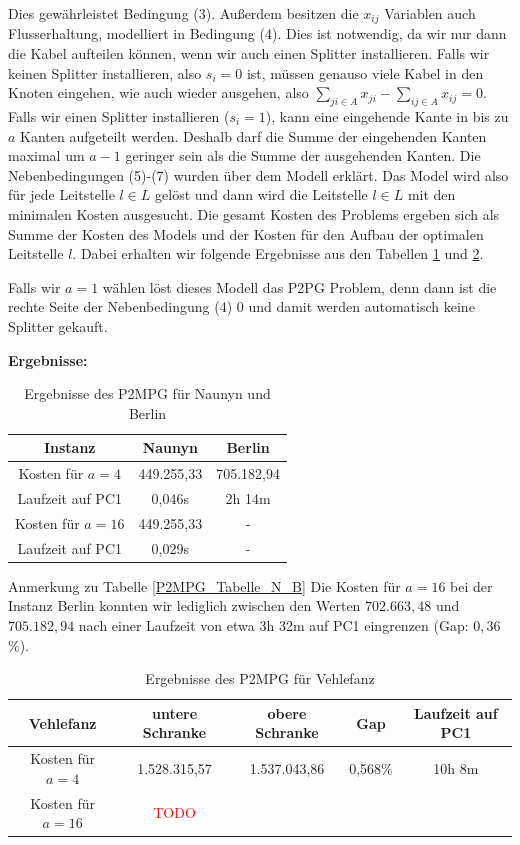 \documentclass[11pt,a4paper]{article}
\newcommand{\TODO}{\textcolor{red}{TODO}}
\theoremstyle{my_th_style1}
\begin{document}
Dies gewährleistet Bedingung (3).
Außerdem besitzen die $x_{ij}$ Variablen auch Flusserhaltung, modelliert in Bedingung (4).
Dies ist notwendig, da wir nur dann die Kabel aufteilen können, wenn wir auch einen Splitter installieren.
Falls wir keinen Splitter installieren, also $s_i=0$ ist, müssen genauso viele Kabel in den Knoten eingehen, wie auch wieder ausgehen, also $\displaystyle\sum_{ji \in A} x_{ji} - \displaystyle\sum_{ij \in A} x_{ij}=0$.
Falls wir einen Splitter installieren ($s_i=1$), kann eine eingehende Kante in bis zu $a$ Kanten aufgeteilt werden.
Deshalb darf die Summe der eingehenden Kanten maximal um \(a-1\) geringer sein als die Summe der ausgehenden Kanten.
Die Nebenbedingungen (5)-(7) wurden über dem Modell erklärt.
Das Model wird also für jede Leitstelle $l \in L$ gelöst und dann wird die Leitstelle $l \in L$ mit den minimalen Kosten ausgesucht. Die gesamt Kosten des Problems ergeben sich als Summe der Kosten des Models und der Kosten für den Aufbau der optimalen Leitstelle $l$. Dabei erhalten wir folgende Ergebnisse aus den Tabellen \ref{P2MPG_Tabelle_N_B} und \ref{P2MPG_Tabelle_V}.
  
Falls wir $a=1$ w\"ahlen l\"ost dieses Modell das P2PG Problem, denn dann ist die rechte Seite der Nebenbedingung (4) 0 und damit werden automatisch keine Splitter gekauft.
 
\textbf{Ergebnisse:}
 \begin{table}[h]
 	\centering
 	\begin{tabular}{c|c|c}
 		Instanz & Naunyn & Berlin \\	
 		\hline
 		 Kosten für $a=4$ & 449.255,33 & 705.182,94 \\
 		 Laufzeit auf PC1 & 0,046s & 2h 14m \\
 		 \hline
 		Kosten für $a=16$ & 449.255,33 & - \\
 		Laufzeit auf PC1 & 0,029s & - \\
 	\end{tabular}
 	\caption{Ergebnisse des P2MPG f\"ur Naunyn und Berlin}
 	\label{P2MPG_Tabelle_N_B}
 \end{table}
 
 Anmerkung zu Tabelle \eqref{P2MPG_Tabelle_N_B} Die Kosten f\"ur \(a=16\) bei der Instanz Berlin konnten wir lediglich zwischen den Werten \(702.663,48\) und \(705.182,94\) nach einer Laufzeit von etwa 3h 32m auf PC1 eingrenzen (Gap: \(0,36\) \%).
 
 \begin{table}[h]
 	\centering
 	\begin{tabular}{c|c|c|c|c}
 		Vehlefanz & untere Schranke & obere Schranke & Gap & Laufzeit auf PC1\\	
 		\hline
 		 Kosten für $a=4$ & 1.528.315,57 & 1.537.043,86 & 0,568\% & 10h 8m\\
 		 \hline
 		Kosten für $a=16$ & \TODO &  & &  \\
 	\end{tabular}
 	\caption{Ergebnisse des P2MPG f\"ur Vehlefanz}
 	\label{P2MPG_Tabelle_V}
 \end{table}
 
\end{document}
